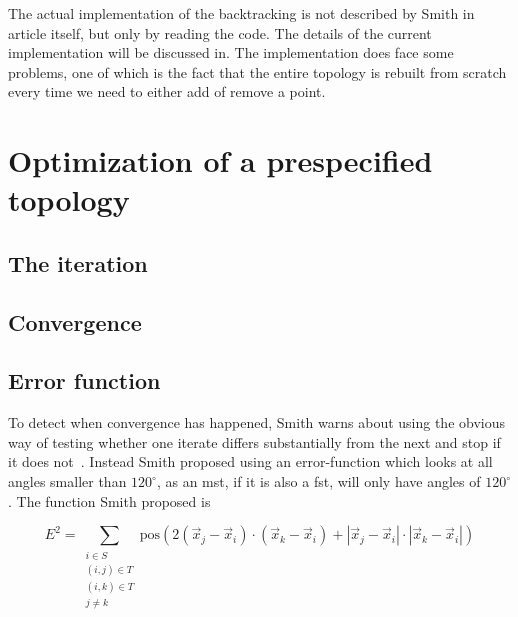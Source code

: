 The actual implementation of the backtracking is not described by Smith in
article itself, but only by reading the code. The details of the current
implementation will be discussed in. The implementation does face some problems, one of which is
the fact that the entire topology is rebuilt from scratch every time we need to
either add of remove a point.

\section{Optimization of a prespecified topology}
\label{sec:optim-presp-topol}


\subsection{The iteration}
\label{sec:iteration}


\subsection{Convergence}
\label{sec:convergence}

\subsection{Error function}
\label{sec:error-function}

To detect when convergence has happened, Smith warns about using the obvious way
of testing whether one iterate differs substantially from the next and stop if
it does not~\cite[p.~151]{Smith1992}. Instead Smith proposed using an
error-function which looks at all angles smaller than $120^{\circ}$, as an
\gls{mst}, if it is also a \gls{fst}, will only have angles of
$120^{\circ}$. The function Smith proposed is

\begin{equation}
  \label{eq:1}
  E^2 = \sum_{
    \begin{array}{c}
      i \in S \\
      (i,j) \in T \\
      (i,k) \in T \\
      j \ne k
    \end{array}}
  \text{pos} (2 (\vec x_j - \vec x_i) \cdot (\vec x_k - \vec x_i) +
  | \vec x_j - \vec x_i | \cdot | \vec x_k - \vec x_i |)
\end{equation}

